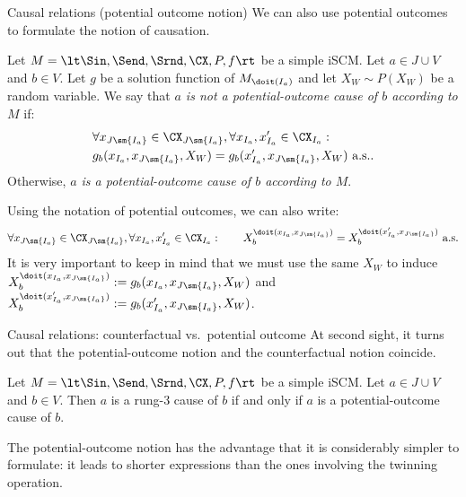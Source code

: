 \begin{frame}{Causal relations (potential outcome notion)}
We can also use potential outcomes to formulate the notion of causation.
\begin{Def}[\ref{def:scm_po_cause_of}]
  Let $M = \lt \Sin, \Send, \Srnd, \CX, P, f \rt$ be a simple iSCM.
  Let $a \in J \cup V$ and $b \in V$.
  Let $g$ be a solution function of $M_{\doit(I_a)}$ and let $X_W \sim P(X_W)$ be a random variable.
  We say that \emph{$a$ is not a potential-outcome cause of $b$ according to $M$} if:
    \begin{equation*}\begin{split}
   & \forall x_{J\sm\{I_a\}} \in \CX_{J\sm\{I_a\}}, \forall x_{I_a},x_{I_a}' \in \CX_{I_a}: \\
      & g_b(x_{I_a},x_{J\sm\{I_a\}},X_W) = g_b(x_{I_a}',x_{J\sm\{I_a\}},X_W) \text{ a.s..}
    \end{split}\end{equation*}
  Otherwise, \emph{$a$ is a potential-outcome cause of $b$ according to $M$}.
\end{Def}
\small
Using the notation of potential outcomes, we can also write:
  $$\forall x_{J\sm\{I_a\}} \in \CX_{J\sm\{I_a\}}, \forall x_{I_a},x_{I_a}' \in \CX_{I_a}: \qquad X^{\doit(x_{I_a},x_{J\sm\{I_a\}})}_b = X^{\doit(x_{I_a}',x_{J\sm\{I_a\}})}_b \text{ a.s.}$$
  \alert{It is very important to keep in mind that we must use the same $X_W$ to induce $X^{\doit(x_{I_a},x_{J\sm\{I_a\}})}_b := g_b(x_{I_a},x_{J\sm\{I_a\}},X_W)$ and $X^{\doit(x_{I_a}',x_{J\sm\{I_a\}})}_b := g_b(x_{I_a}',x_{J\sm\{I_a\}},X_W)$.}
\end{frame}

\begin{frame}{Causal relations: counterfactual vs.\ potential outcome}
At second sight, it turns out that the potential-outcome notion and the counterfactual notion coincide.
  \begin{Prp}[\ref{prp:scm_cause_of_rung3_po}]
  Let $M = \lt \Sin, \Send, \Srnd, \CX, P, f \rt$ be a simple iSCM.
  Let $a \in J \cup V$ and $b \in V$.
  Then $a$ is a rung-3 cause of $b$ if and only if $a$ is a potential-outcome cause of $b$.
\end{Prp}
The potential-outcome notion has the advantage that it is considerably simpler to formulate: it leads to shorter expressions than the ones involving the twinning operation.
\end{frame}

